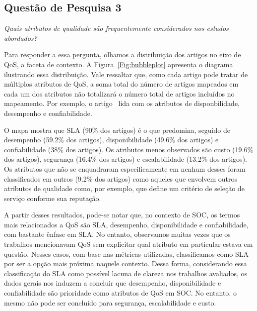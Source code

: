 \subsection{Quest\~{a}o de Pesquisa 3}
\emph{Quais atributos de qualidade são frequentemente considerados nos estudos abordados?}

Para responder a essa pergunta, olhamos a distribui\c{c}\~{a}o dos artigos no eixo de QoS, a faceta de contexto. A Figura~\ref{Fig:bubbleplot} apresenta o diagrama ilustrando essa distribui\c{c}\~{a}o. Vale ressaltar que, como cada artigo pode tratar de m\'{u}ltiplos atributos de QoS, a soma total do n\'{u}mero de artigos mapeados em cada um dos atributos n\~{a}o totalizar\'{a} o n\'{u}mero total de artigos inclu\'{i}dos no mapeamento. Por exemplo, o artigo~\cite{DBLP:journals/tse/CalinescuGKMT11} lida com os atributos de disponbilidade, desempenho e confiabilidade. 

O mapa mostra que SLA (90\% dos artigos) \'{e} o que predomina, seguido de desempenho (59.2\% dos artigos), disponibilidade (49.6\% dos artigos) e confiabilidade (38\% dos artigos). Os atributos menos observados s\~{a}o custo (19.6\% dos artigos), seguran\c{c}a (16.4\% dos artigos) e escalabilidade (13.2\% dos artigos). Os atributos que n\~{a}o se enquadraram especificamente em nenhum desses foram classificados em outros (9.2\% dos artigos) como aqueles que envolvem outros atributos de qualidade como, por exemplo, \cite{6036406} que define um crit\'{e}rio de sele\c{c}\~{a}o de servi\c{c}o conforme sua reputa\c{c}\~{a}o. 

A partir desses resultados, pode-se notar que, no contexto de SOC, os termos mais relacionados a QoS s\~{a}o SLA, desempenho, disponibilidade e confiabilidade, com bastante \^{e}nfase em SLA. No entanto, observamos muitas vezes que os trabalhos mencionavam QoS sem explicitar qual atributo em particular estava em quest\~{a}o. Nesses casos, com base nas m\'{e}tricas utilizadas, classificamos como SLA por ser a op\c{c}\~{a}o mais pr\'{o}xima naquele contexto. Dessa forma, considerando essa classifica\c{c}\~{a}o do SLA como poss\'{i}vel lacuna de clareza nos trabalhos avaliados, os dados gerais nos induzem a concluir que desempenho, disponibilidade e confiabilidade s\~{a}o prioridade como atributos de QoS em SOC. No entanto, o mesmo n\~{a}o pode ser conclu\'{i}do para seguran\c{c}a, escalabilidade e custo. 

